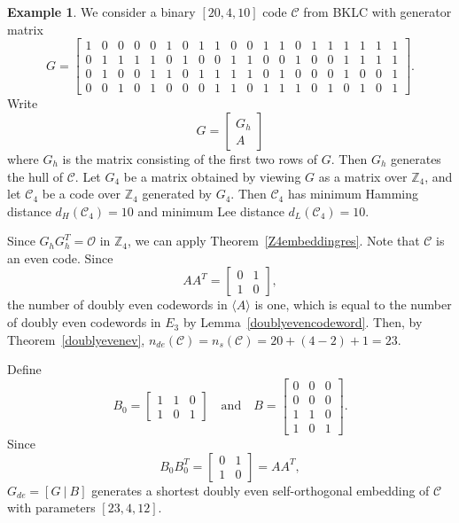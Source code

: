 \documentclass{article}
\theoremstyle{definition}
\newtheorem{example}{Example}[section]
\theoremstyle{remark}
\begin{document}
\begin{example}
We consider a binary $[20, 4, 10]$ code $\mathcal{C}$ from BKLC with generator matrix
\[
G=
\begin{bmatrix}
1&0&0&0&0&1&0&1&1&0&0&1&1&0&1&1&1&1&1&1\\
0&1&1&1&1&0&1&0&0&1&1&0&0&1&0&0&1&1&1&1\\
0&1&0&0&1&1&0&1&1&1&1&0&1&0&0&0&1&0&0&1\\
0&0&1&0&1&0&0&0&1&1&0&1&1&1&0&1&0&1&0&1
\end{bmatrix}.
\]
Write
\[
G=\begin{bmatrix}
    G_h\\A
\end{bmatrix}
\]
where $G_h$ is the matrix consisting of the first two rows of $G$. Then $G_h$ generates the hull of $\mathcal{C}$. Let $G_4$ be a matrix obtained by viewing $G$ as a matrix over $\mathbb{Z}_4$, and let $\mathcal{C}_4$ be a code over $\mathbb{Z}_4$ generated by $G_4$. Then $\mathcal{C}_4$ has minimum Hamming distance $d_H(\mathcal{C}_4)=10$ and minimum Lee distance $d_L(\mathcal{C}_4)=10$.

Since $G_hG_h^T=\mathcal{O}$ in $\mathbb{Z}_4$, we can apply Theorem~\ref{Z4embeddingres}. Note that $\mathcal{C}$ is an even code. Since
\[
AA^T=\begin{bmatrix}
    0 & 1\\1 & 0
\end{bmatrix},
\]
the number of doubly even codewords in $\langle A\rangle$ is one, which is equal to the number of doubly even codewords in $E_3$ by Lemma~\ref{doublyevencodeword}. Then, by Theorem~\ref{doublyevenev}, $n_{de}(\mathcal{C})=n_s(\mathcal{C})=20+(4-2)+1=23$.

Define
\[
B_0=\begin{bmatrix}
    1 & 1 & 0\\1 & 0 & 1
\end{bmatrix}\quad\mbox{and}\quad B=\begin{bmatrix}
    0 & 0 & 0\\0 & 0 & 0\\1 & 1 & 0\\1 & 0 & 1
\end{bmatrix}.
\]
Since
\[
B_0B_0^T=\begin{bmatrix}
    0 & 1\\1 & 0
\end{bmatrix}=AA^T,
\]
$G_{de}=[G~|~B]$ generates a shortest doubly even self-orthogonal embedding of $\mathcal{C}$ with parameters $[23, 4, 12]$.


\end{example}
\end{document}
